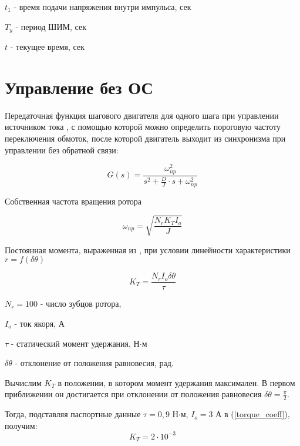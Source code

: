 $t_{1}$ - время подачи напряжения внутри импульса, сек

$T_{y}$ - период ШИМ, сек

$t$ - текущее время, сек

\newpage
\part{ Управление без ОС }

Передаточная функция шагового двигателя для одного шага при управлении источником тока \cite[гл. 4.2, ф-ла 4.65]{Kenio}, с помощью которой можно определить пороговую частоту переключения обмоток, после которой двигатель выходит из синхронизма при управлении без обратной связи:

\begin{equation}
    \label{step_motor_transfer_function}
    G(s) = \frac{ \omega_{np}^{2} }
                { s^{2} + \frac{D}{J} \cdot s + \omega_{np}^{2} }
\end{equation}

Собственная частота вращения ротора \cite[гл. 4.2, ф-ла 4.48]{Kenio}

\begin{equation}
    \label{rotor_natural_frequency}
    \omega_{np} = \sqrt{\frac{N_{r}K_{T}I_{o}}{J}}
\end{equation}

Постоянная момента, выраженная из \cite[гл. 4.2, ф-ла 4.52]{Kenio}, при условии линейности характеристики $r = f(\delta\theta)$

\begin{equation}
    \label{torque_coeff}
    K_{T} = \frac{N_{r}I_{o}\delta\theta}{\tau}
\end{equation}

$N_{r} = 100$ - число зубцов ротора,

$I_{o}$ - ток якоря, А

$\tau$ - статический момент удержания, Н$\cdot$м

$\delta\theta$ - отклонение от положения равновесия, рад.
\newline\newline

Вычислим $K_{T}$ в положении, в котором момент удержания максимален. В первом приближении он достигается при отклонении от положения равновесия $\delta\theta = \frac{\pi}{2}$.

Тогда, подставляя паспортные данные $\tau = 0,9$ Н$\cdot$м, $I_{o} = 3$ А в (\ref{torque_coeff}), получим:
\begin{equation}
    \label{first_approximation_moment_coeff}
    K_{T} = 2\cdot10^{-3}
\end{equation}

